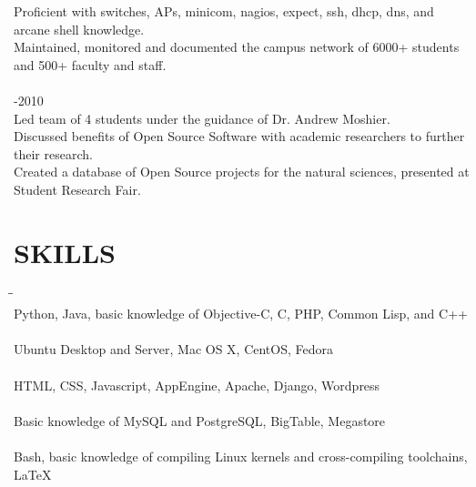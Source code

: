 \documentclass{res}
\begin{document}
\begin{resume}
\begin{tabbing}
    Proficient with switches, APs, minicom, nagios, expect, ssh, dhcp, dns, and arcane shell knowledge.\\
    Maintained, monitored and documented the campus network of 6000+ students and 500+ faculty and staff.\\
\\
  \hspace{-0.25in}{\bf Student Researcher, Chapman University CS Department} \>    -2010\\
    Led team of 4 students under the guidance of Dr. Andrew Moshier.\\
    Discussed benefits of Open Source Software with academic researchers to further their research.\\
    Created a database of Open Source projects for the natural sciences, presented at Student Research Fair. \\
  \end{tabbing}
  \vspace{-0.4in}

\section{SKILLS}
  \vspace{-5pt}
  \begin{tabbing}
  \hspace{2.5in}\= \hspace{3.45in}\= \kill %
  \hspace{-0.25in}{\bf Programming Languages} \> \> \\
    Python, Java, basic knowledge of Objective-C, C, PHP, Common Lisp, and C++\\
  \hspace{-0.25in}{\bf Operating Systems} \> \> \\
    Ubuntu Desktop and Server, Mac OS X, CentOS, Fedora\\
  \hspace{-0.25in}{\bf Web Development} \> \> \\
    HTML, CSS, Javascript, AppEngine, Apache, Django, Wordpress\\
  \hspace{-0.25in}{\bf Databases} \> \> \\
    Basic knowledge of MySQL and PostgreSQL, BigTable, Megastore\\
  \hspace{-0.25in}{\bf Systems Administration} \> \> \\
    Bash, basic knowledge of compiling Linux kernels and cross-compiling toolchains, \LaTeX\\
  \vspace{-0.4in}


\end{tabbing}
\end{resume}
\end{document}
